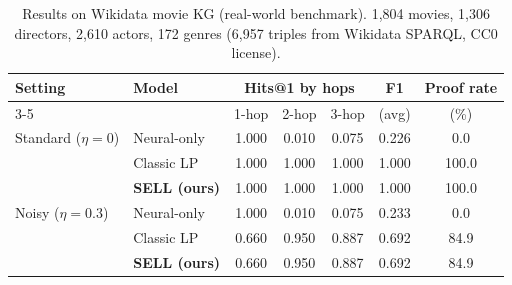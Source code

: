 \begin{table}[t]
\centering
\caption{Results on Wikidata movie KG (real-world benchmark). 1{,}804 movies, 1{,}306 directors, 2{,}610 actors, 172 genres (6{,}957 triples from Wikidata SPARQL, CC0 license).}
\label{tab:wikidata_results}
\small
\begin{tabular}{llccccc}
\toprule
Setting & Model & \multicolumn{3}{c}{Hits@1 by hops} & F1 & Proof rate \\
\cmidrule(lr){3-5}
 & & 1-hop & 2-hop & 3-hop & (avg) & (\%) \\
\midrule
 Standard ($\eta{=}0$) & Neural-only & 1.000 & 0.010 & 0.075 & 0.226 & 0.0 \\
   & Classic LP & 1.000 & 1.000 & 1.000 & 1.000 & 100.0 \\
   & \textbf{SELL (ours)} & 1.000 & 1.000 & 1.000 & 1.000 & 100.0 \\
\midrule
 Noisy ($\eta{=}0.3$) & Neural-only & 1.000 & 0.010 & 0.075 & 0.233 & 0.0 \\
   & Classic LP & 0.660 & 0.950 & 0.887 & 0.692 & 84.9 \\
   & \textbf{SELL (ours)} & 0.660 & 0.950 & 0.887 & 0.692 & 84.9 \\
\bottomrule
\end{tabular}
\end{table}